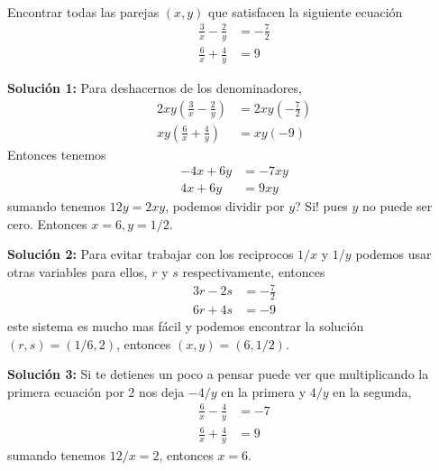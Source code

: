 \begin{ejemplo}{\ \\}
	Encontrar todas las parejas $(x,y)$ que satisfacen la siguiente ecuación
	\begin{align*}
	\frac{3}{x} - \frac{2}{y} &= -\frac{7}{2}\\
	\frac{6}{x} + \frac{4}{y} &= 9
	\end{align*}
	
	\textbf{Solución 1: }
	Para deshacernos de los denominadores,
	\begin{align*}
	2xy \left( \frac{3}{x} - \frac{2}{y} \right) &= 2xy\left( -\frac{7}{2} \right)\\
	xy \left( \frac{6}{x} + \frac{4}{y} \right) &= xy\left( -9 \right)
	\end{align*}
	Entonces tenemos
	\begin{align*}
	-4x+6y&=-7xy \\
	4x+6y&=9xy
	\end{align*}
	sumando tenemos $12y=2xy$, podemos dividir por $y$? Si! pues $y$ no puede ser cero. Entonces $x=6,y=1/2$.
	
	\textbf{Solución 2: }
	Para evitar trabajar con los reciprocos $1/x$ y $1/y$ podemos usar otras variables para ellos, $r$ y $s$ respectivamente, entonces
	\begin{align*}
	3r -2s&=  -\frac{7}{2} \\
	6r + 4s &= -9 
	\end{align*}
	este sistema es mucho mas fácil y podemos encontrar la solución $(r,s)=(1/6,2)$, entonces $(x,y)=(6,1/2)$.
	
	\textbf{Solución 3: }
	Si te detienes un poco a pensar puede ver que multiplicando la primera ecuación por 2 nos deja $-4/y$ en la primera y $4/y$ en la segunda,
	\begin{align*}
	\frac{6}{x} - \frac{4}{y} &= -7\\
	\frac{6}{x} + \frac{4}{y} &= 9
	\end{align*}
	sumando tenemos $12/x = 2$, entonces $x=6$.		
\end{ejemplo}

